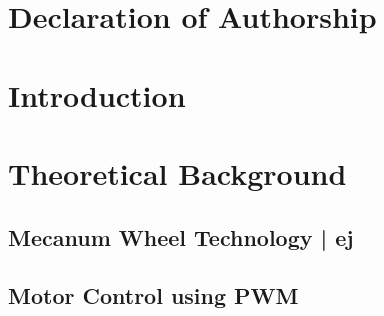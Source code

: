 \documentclass[a4paper, 12pt,titlepage,openany]{report}
\begin{document}
	\begin{abstract}
		\thispagestyle{plain}
		\setcounter{page}{2}
		
	\end{abstract}
	
	\cleardoublepage
	\setcounter{page}{3}
	
	\tableofcontents
	
	\chapter*{Declaration of Authorship}
	
	
	\clearpage
	
	\setcounter{chapter}{0}
	
	\chapter{Introduction}
	\label{ch:Intro}
	
	\chapter{Theoretical Background}
	\label{ch:Theory}
	
	\section{Mecanum Wheel Technology | \acs{ej}}
	\label{sec:TheoryMecanumWheels}
	
	
	\section{Motor Control using PWM}
	\label{sec:TheoryPWM}
	
\end{document}
